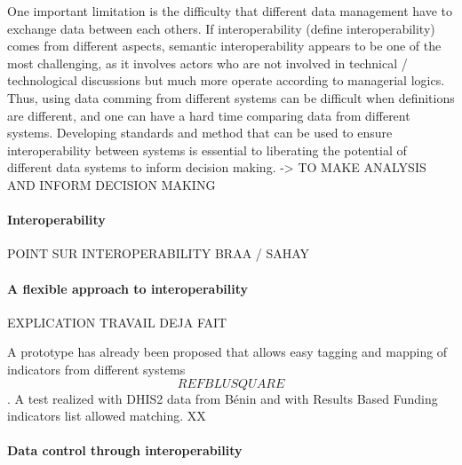 \documentclass[a4paper,11pt,final,twoside]{article}
\begin{document}
One important limitation is the difficulty that different data management have to exchange data between each others. If interoperability (define interoperability) comes from different aspects, semantic interoperability appears to be one of the most challenging, as it involves actors who are not involved in technical / technological discussions but much more operate according to managerial logics. Thus, using data comming from different systems can be difficult when definitions are different, and one can have a hard time comparing data from different systems. Developing standards and method that can be used to ensure interoperability between systems is essential to liberating the potential of different data systems to inform decision making. -> TO MAKE ANALYSIS AND INFORM DECISION MAKING

\paragraph{Interoperability} POINT SUR INTEROPERABILITY BRAA / SAHAY

\paragraph{A flexible approach to interoperability}EXPLICATION TRAVAIL DEJA FAIT

A prototype has already been proposed that allows easy tagging and mapping of indicators from different systems \[REF BLUSQUARE\]. A test realized with DHIS2 data from Bénin and with Results Based Funding indicators list allowed matching. XX 

\paragraph{Data control through interoperability}
\end{document}
